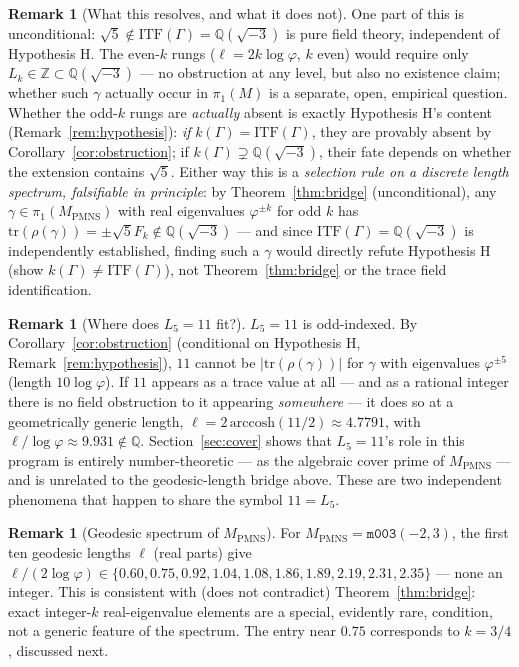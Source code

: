 \documentclass[12pt]{article}
\theoremstyle{definition}
\newtheorem{remark}[theorem]{Remark}
\newcommand{\Z}{\mathbb{Z}}
\newcommand{\Q}{\mathbb{Q}}
\newcommand{\ph}{\varphi}
\newcommand{\logph}{\log\ph}
\newcommand{\tr}{\mathrm{tr}}
\newcommand{\ITF}{\mathrm{ITF}}
\begin{document}
\begin{remark}[What this resolves, and what it does not]
\label{rem:resolution}
One part of this is unconditional: $\sqrt5\notin\ITF(\Gamma)=\Q(\sqrt{-3})$
is pure field theory, independent of Hypothesis H. The even-$k$ rungs
($\ell=2k\logph$, $k$ even) would require only $L_k\in\Z\subset\Q(\sqrt{-3})$
--- no obstruction at any level, but also no existence claim; whether
such $\gamma$ actually occur in $\pi_1(M)$ is a separate, open,
empirical question. Whether the odd-$k$ rungs are \emph{actually}
absent is exactly Hypothesis H's content (Remark~\ref{rem:hypothesis}):
\emph{if} $k(\Gamma)=\ITF(\Gamma)$, they are provably absent by
Corollary~\ref{cor:obstruction}; if $k(\Gamma)\supsetneq\Q(\sqrt{-3})$,
their fate depends on whether the extension contains $\sqrt5$. Either
way this is a \emph{selection rule on a discrete length spectrum,
falsifiable in principle}: by Theorem~\ref{thm:bridge} (unconditional),
any $\gamma\in\pi_1(M_{\mathrm{PMNS}})$ with real eigenvalues
$\ph^{\pm k}$ for odd $k$ has $\tr(\rho(\gamma))=\pm\sqrt5F_k\notin\Q(\sqrt{-3})$
--- and since $\ITF(\Gamma)=\Q(\sqrt{-3})$ is independently established,
finding such a $\gamma$ would directly refute Hypothesis H (show
$k(\Gamma)\neq\ITF(\Gamma)$), not Theorem~\ref{thm:bridge} or the trace
field identification.
\end{remark}

\begin{remark}[Where does $L_5=11$ fit?]
\label{rem:L5}
$L_5=11$ is odd-indexed. By Corollary~\ref{cor:obstruction} (conditional
on Hypothesis H, Remark~\ref{rem:hypothesis}), $11$
cannot be $|\tr(\rho(\gamma))|$ for $\gamma$ with eigenvalues
$\ph^{\pm5}$ (length $10\logph$). If $11$ appears as a trace value at
all --- and as a rational integer there is no field obstruction to it
appearing \emph{somewhere} --- it does so at a geometrically generic
length, $\ell=2\,\mathrm{arccosh}(11/2)\approx4.7791$, with
$\ell/\logph\approx9.931\notin\Q$. Section~\ref{sec:cover} shows that
$L_5=11$'s role in this program is entirely number-theoretic ---
as the algebraic cover prime of $M_{\mathrm{PMNS}}$ --- and is
unrelated to the geodesic-length bridge above. These are two
independent phenomena that happen to share the symbol $11=L_5$.
\end{remark}

\begin{remark}[Geodesic spectrum of $M_{\mathrm{PMNS}}$]
\label{rem:spectrum}
For $M_{\mathrm{PMNS}}=\texttt{m003}(-2,3)$, the first ten geodesic
lengths $\ell$ (real parts) give $\ell/(2\logph)\in
\{0.60,0.75,0.92,1.04,1.08,1.86,1.89,2.19,2.31,2.35\}$ --- none an
integer. This is consistent with (does not contradict)
Theorem~\ref{thm:bridge}: exact integer-$k$ real-eigenvalue elements
are a special, evidently rare, condition, not a generic feature of
the spectrum. The entry near $0.75$ corresponds to $k=3/4$, discussed
next.
\end{remark}
\end{document}
